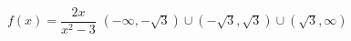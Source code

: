{$f(x) = \dfrac{2x}{x^2-3}$}
{$(-\infty, -\sqrt{3}) \cup (-\sqrt{3}, \sqrt{3}) \cup (\sqrt{3}, \infty)$}
